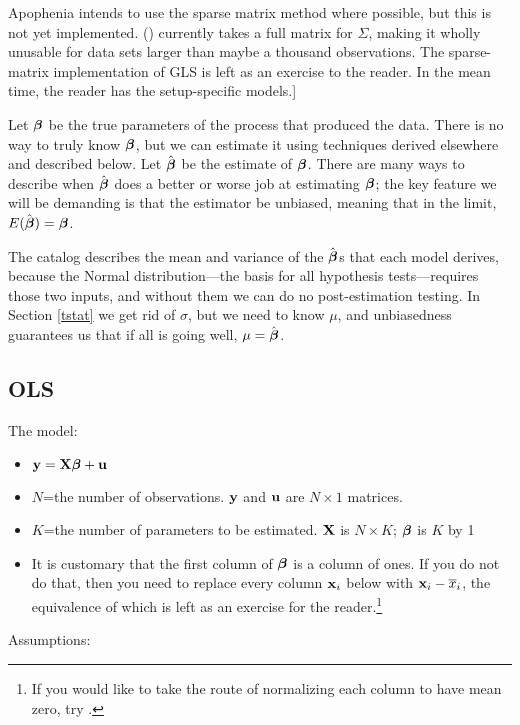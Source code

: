 Apophenia intends to use the sparse matrix method where possible, but this is not yet
implemented. () currently takes a full matrix
for $\Sigma$, making it wholly unusable for data sets larger than maybe a
thousand observations. The sparse-matrix implementation of GLS is
left as an exercise to the reader. In the mean time, the reader has the
setup-specific models.]

Let ${\mbox{\boldmath$\beta$}}$ be the true parameters of the process that produced the
data. There is no way to truly know ${\mbox{\boldmath$\beta$}}$, but we can estimate it
using techniques derived elsewhere and described below. Let 
$\hat{{\mbox{\boldmath$\beta$}}}$ be the estimate of ${\mbox{\boldmath$\beta$}}$.  There are many ways to
describe when $\hat{{\mbox{\boldmath$\beta$}}}$ does a better or worse job at estimating 
${\mbox{\boldmath$\beta$}}$; the key feature we will be demanding is that the estimator be
unbiased, meaning that in the limit, $E(\hat{{\mbox{\boldmath$\beta$}}}) = {\mbox{\boldmath$\beta$}}$.

The catalog describes the mean and variance of the $\hat{{\mbox{\boldmath$\beta$}}}$s that
each model derives, because the Normal distribution---the basis for all
hypothesis tests---requires those two inputs,
and without them we can do no post-estimation testing.  
In Section \ref{tstat} we get rid of $\sigma$, but we
need to know $\mu$, and unbiasedness guarantees us that if all is going
well, $\mu =\hat{{\mbox{\boldmath$\beta$}}}$.

\subsection{OLS}
The model: 
\begin{itemize}
\item ${\bf y}={\bf X}{\mbox{\boldmath$\beta$}} + {\bf u}$
\item $N$=the number of observations. ${\bf y}$ and ${\bf u}$ are $N \times 1$
matrices.
\item $K$=the number of parameters to be estimated. ${\bf X}$ is $N \times K$;
${\mbox{\boldmath$\beta$}}$ is $K$ by 1
\item It is customary that the first column of ${\mbox{\boldmath$\beta$}}$ is a column of
ones. If you do not do that, then you need to replace every column ${\bf x}_i$ below
with ${\bf x}_i-\overline x_i$, the equivalence of which is left as an exercise
for the reader.\footnote{If you would like to take the route of
normalizing each column to have mean zero, try
.}
\end{itemize}

Assumptions:

